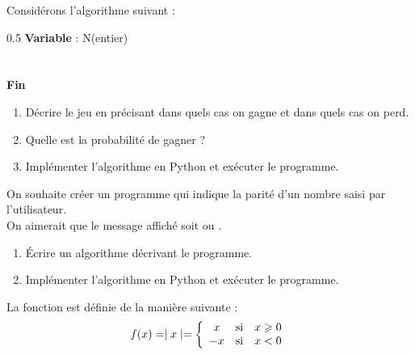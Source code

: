 \begin{boxexstheorieligne}\renewcommand{\eexo}{\vspace{8mm}}
\exo
Considérons l'algorithme suivant :

\medskip
\begin{center}
\begin{affichagealgorithme}{0.5}
\textbf{Variable} : N(entier)\\
\\
\\
\textbf{Fin}
\end{affichagealgorithme}
\end{center}

\vspace{-6mm}
\begin{enumerate}[label=\alph*),itemsep=0mm]
\item Décrire le jeu en précisant dans quels cas on gagne et dans quels cas on perd.
\item Quelle est la probabilité de gagner ?
\item Implémenter l'algorithme en Python et exécuter le programme.
\end{enumerate}




\eexo




\exo
On souhaite créer un programme qui indique la parité d'un nombre saisi par l'utilisateur.\\
On aimerait que le message affiché soit  ou .
\begin{enumerate}[label=\alph*),itemsep=0mm]
\item Écrire un algorithme décrivant le programme.
\item Implémenter l'algorithme en Python et exécuter le programme.
\end{enumerate}




\eexo




\exo
La fonction  est définie de la manière suivante :
$$f(x)=\mid x\mid=\left\lbrace\begin{array}{c c l}
x & \textrm{si}  & x\geqslant 0\\
-x & \textrm{si}  & x < 0
\end{array}\right.$$


\end{boxexstheorieligne}
